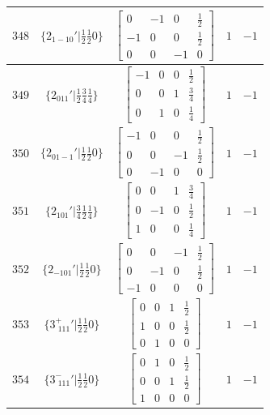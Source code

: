 \documentclass[fleqn,8pt]{jsarticle}
\begin{document}
\begin{longtable}{ccccc}
$ 348 $ & $ \{2{}_{1-10}{}'|\frac{1}{2} \frac{1}{2} 0\} $ & $ \begin{bmatrix} 0 & -1 & 0 & \frac{1}{2} \\ -1 & 0 & 0 & \frac{1}{2} \\ 0 & 0 & -1 & 0 \end{bmatrix} $ & $ 1 $ & $ -1 $ \\ \hline
$ 349 $ & $ \{2{}_{011}{}'|\frac{1}{2} \frac{3}{4} \frac{1}{4}\} $ & $ \begin{bmatrix} -1 & 0 & 0 & \frac{1}{2} \\ 0 & 0 & 1 & \frac{3}{4} \\ 0 & 1 & 0 & \frac{1}{4} \end{bmatrix} $ & $ 1 $ & $ -1 $ \\ \hline
$ 350 $ & $ \{2{}_{01-1}{}'|\frac{1}{2} \frac{1}{2} 0\} $ & $ \begin{bmatrix} -1 & 0 & 0 & \frac{1}{2} \\ 0 & 0 & -1 & \frac{1}{2} \\ 0 & -1 & 0 & 0 \end{bmatrix} $ & $ 1 $ & $ -1 $ \\ \hline
$ 351 $ & $ \{2{}_{101}{}'|\frac{3}{4} \frac{1}{2} \frac{1}{4}\} $ & $ \begin{bmatrix} 0 & 0 & 1 & \frac{3}{4} \\ 0 & -1 & 0 & \frac{1}{2} \\ 1 & 0 & 0 & \frac{1}{4} \end{bmatrix} $ & $ 1 $ & $ -1 $ \\ \hline
$ 352 $ & $ \{2{}_{-101}{}'|\frac{1}{2} \frac{1}{2} 0\} $ & $ \begin{bmatrix} 0 & 0 & -1 & \frac{1}{2} \\ 0 & -1 & 0 & \frac{1}{2} \\ -1 & 0 & 0 & 0 \end{bmatrix} $ & $ 1 $ & $ -1 $ \\ \hline
$ 353 $ & $ \{3^{+}_{\,\,111}{}'|\frac{1}{2} \frac{1}{2} 0\} $ & $ \begin{bmatrix} 0 & 0 & 1 & \frac{1}{2} \\ 1 & 0 & 0 & \frac{1}{2} \\ 0 & 1 & 0 & 0 \end{bmatrix} $ & $ 1 $ & $ -1 $ \\ \hline
$ 354 $ & $ \{3^{-}_{\,\,111}{}'|\frac{1}{2} \frac{1}{2} 0\} $ & $ \begin{bmatrix} 0 & 1 & 0 & \frac{1}{2} \\ 0 & 0 & 1 & \frac{1}{2} \\ 1 & 0 & 0 & 0 \end{bmatrix} $ & $ 1 $ & $ -1 $ \\ \hline

\end{longtable}
\end{document}

